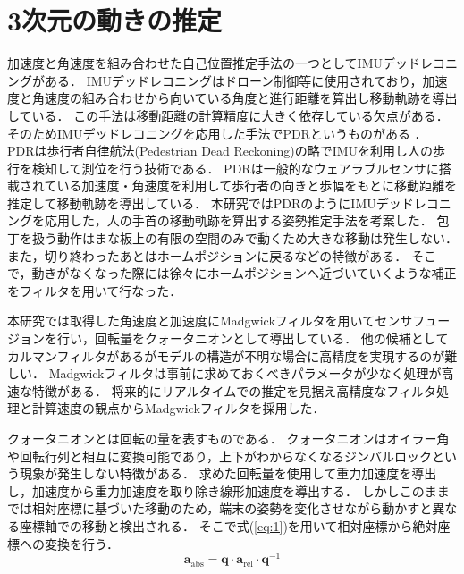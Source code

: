 \section{3次元の動きの推定}
加速度と角速度を組み合わせた自己位置推定手法の一つとしてIMUデッドレコニング\cite{スマートフォンを用いた歩行者デッドレコニングのための進行方向推定に関する研究}がある．
IMUデッドレコニングはドローン制御等に使用されており，加速度と角速度の組み合わせから向いている角度と進行距離を算出し移動軌跡を導出している．
この手法は移動距離の計算精度に大きく依存している欠点がある．
そのためIMUデッドレコニングを応用した手法でPDRというものがある
\cite{Trajectory Estimation Method of People in Forest Based on Inertial Sensor}
\cite{Indoor Positioning System Based on Chest-Mounted IMU}
\cite{A review of smartphones-based indoor positioning: Challenges and applications}
\cite{スマートフォンとスマートウォッチを併用したPDRによる屋内位置推定}．
PDRは歩行者自律航法(Pedestrian Dead Reckoning)の略でIMUを利用し人の歩行を検知して測位を行う技術である．
PDRは一般的なウェアラブルセンサに搭載されている加速度・角速度を利用して歩行者の向きと歩幅をもとに移動距離を推定して移動軌跡を導出している．
本研究ではPDRのようにIMUデッドレコニングを応用した，人の手首の移動軌跡を算出する姿勢推定手法を考案した．
包丁を扱う動作はまな板上の有限の空間のみで動くため大きな移動は発生しない．
また，切り終わったあとはホームポジションに戻るなどの特徴がある．
そこで，動きがなくなった際には徐々にホームポジションへ近づいていくような補正をフィルタを用いて行なった．

本研究では取得した角速度と加速度にMadgwickフィルタを用いてセンサフュージョンを行い，回転量をクォータニオンとして導出している．
他の候補としてカルマンフィルタがあるがモデルの構造が不明な場合に高精度を実現するのが難しい．
Madgwickフィルタは事前に求めておくべきパラメータが少なく処理が高速な特徴がある．
将来的にリアルタイムでの推定を見据え高精度なフィルタ処理と計算速度の観点からMadgwickフィルタを採用した．

クォータニオンとは回転の量を表すものである．
クォータニオンはオイラー角や回転行列と相互に変換可能であり，上下がわからなくなるジンバルロックという現象が発生しない特徴がある．
求めた回転量を使用して重力加速度を導出し，加速度から重力加速度を取り除き線形加速度を導出する．
しかしこのままでは相対座標に基づいた移動のため，端末の姿勢を変化させながら動かすと異なる座標軸での移動と検出される．
そこで式(\ref{eq:1})を用いて相対座標から絶対座標への変換を行う．
\begin{equation}
	\mathbf{a}_{\text{abs}} = \mathbf{q} \cdot \mathbf{a}_{\text{rel}} \cdot \mathbf{q}^{-1}
	\label{eq:1}
\end{equation}
	
